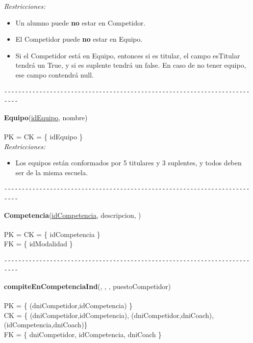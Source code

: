 \textit{Restricciones:}
\begin{itemize}
	\item Un alumno puede \textbf{no} estar en Competidor.
	\item El Competidor puede \textbf{no} estar en Equipo.
	\item Si el Competidor está en Equipo, entonces si es titular, el campo esTitular tendrá un True, y si es suplente tendrá un false. En caso de no tener equipo, ese campo contendrá null.
\end{itemize}

\begin{verbatim}
--------------------------------------------------------------------------
\end{verbatim}

\noindent\textbf{Equipo}(\uline{idEquipo}, nombre)
\\
\\
PK = CK = \{ idEquipo \} \\

\textit{Restricciones:}
\begin{itemize}
	\item Los equipos están conformados por 5 titulares y 3 suplentes, y todos deben ser de la misma escuela.
\end{itemize}


\begin{verbatim}
--------------------------------------------------------------------------
\end{verbatim}

\noindent\textbf{Competencia}(\uline{idCompetencia}, descripcion, )
\\
\\
PK = CK = \{ idCompetencia \} \\
FK = \{ idModalidad \} \\

\begin{verbatim}
--------------------------------------------------------------------------
\end{verbatim}

\noindent\textbf{compiteEnCompetenciaInd}(, , , puestoCompetidor)
\\
\\
PK = \{ (dniCompetidor,idCompetencia) \} \\
CK = \{ (dniCompetidor,idCompetencia), (dniCompetidor,dniCoach), (idCompetencia,dniCoach)\} \\
FK = \{ dniCompetidor, idCompetencia, dniCoach \} \\

